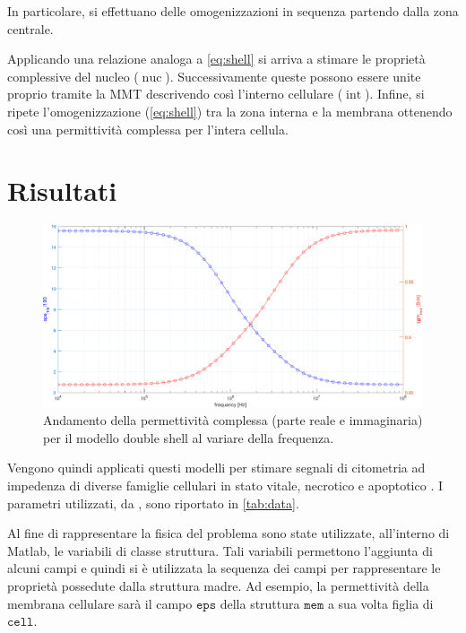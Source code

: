 In particolare, si effettuano delle omogenizzazioni in sequenza partendo dalla zona centrale. 

Applicando una relazione analoga a \cref{eq:shell} si arriva a stimare le proprietà complessive del nucleo ($\operatorname{nuc}$). Successivamente queste possono essere unite proprio tramite la MMT descrivendo così l'interno cellulare ($\operatorname{int}$). Infine, si ripete l'omogenizzazione (\cref{eq:shell}) tra la zona interna e la membrana ottenendo così una permittività complessa per l'intera cellula. 


\section{Risultati}


\begin{figure}[t!]
	\centering
	\includegraphics[width=0.95\linewidth]{../code/figs/epstilde_mix_plot}
	\caption{Andamento della permettività complessa (parte reale e immaginaria) per il modello double shell al variare della frequenza.}
	\label{fig:epstildemixplot}
\end{figure}



Vengono quindi applicati questi modelli per stimare segnali di citometria ad impedenza di diverse famiglie cellulari in stato vitale, necrotico e apoptotico \cite{de_ninno_high-throughput_2020}.
I parametri utilizzati, da \citeauthor{de_ninno_high-throughput_2020}, sono riportato in \cref{tab:data}.

Al fine di rappresentare la fisica del problema sono state utilizzate, all'interno di Matlab, le variabili di classe struttura. Tali variabili permettono l'aggiunta di alcuni campi e quindi si è utilizzata la sequenza dei campi per rappresentare le proprietà possedute dalla struttura madre. Ad esempio, la permettività della membrana cellulare sarà il campo $\mathtt{eps}$ della struttura $\mathtt{mem}$ a sua volta figlia di $\mathtt{cell}$. 

